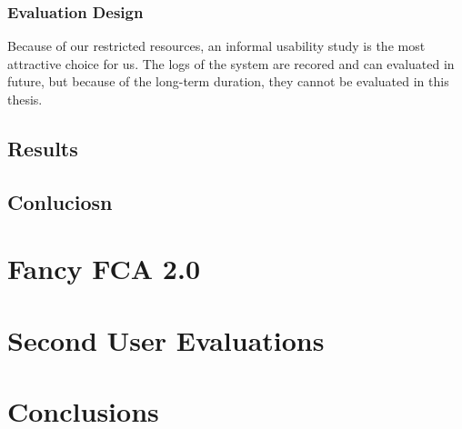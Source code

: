 \documentclass[11pt]{report}
\begin{document}
\subsection{Evaluation Design}

Because of our restricted resources, an informal usability study is the most attractive choice for us. The logs of the system are recored and can evaluated in future, but because of the long-term duration, they cannot be evaluated in this thesis.
\section{Results}

\section{Conluciosn}

\chapter{Fancy FCA 2.0}

\chapter{Second User Evaluations}

\blindtext

\chapter{Conclusions}

\blindtext

\newpage



\end{document}
